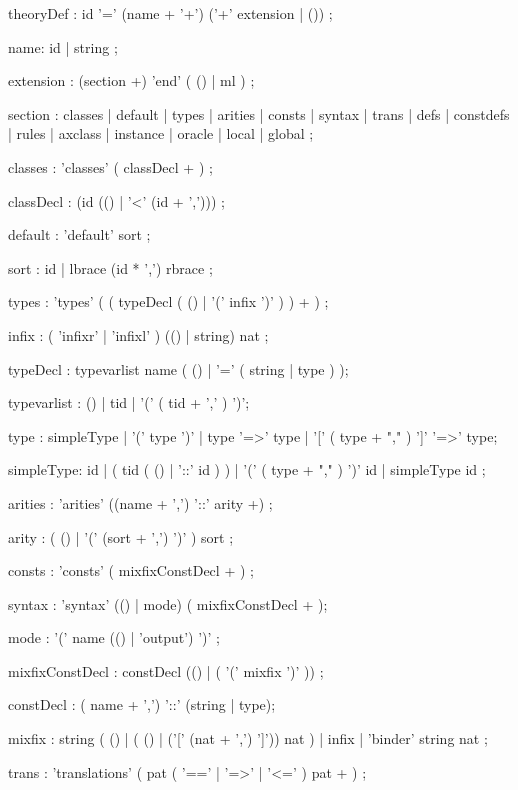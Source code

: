 \begin{rail}

theoryDef : id '=' (name + '+') ('+' extension | ())
          ;

name: id | string
    ;

extension : (section +) 'end' ( () | ml )
          ;

section : classes
        | default
        | types
        | arities
        | consts
        | syntax
        | trans
        | defs
        | constdefs
        | rules
        | axclass
        | instance
        | oracle
        | local
        | global
        ;

classes : 'classes' ( classDecl + )
        ;

classDecl : (id (() | '<' (id + ',')))
        ;

default : 'default' sort 
        ;

sort :  id
     | lbrace (id * ',') rbrace
     ;

types : 'types' ( ( typeDecl ( () | '(' infix ')' ) ) + )
      ;

infix : ( 'infixr' | 'infixl' ) (() | string) nat
      ;

typeDecl : typevarlist name
           ( () | '=' ( string | type ) );

typevarlist : () | tid | '(' ( tid + ',' ) ')';

type : simpleType | '(' type ')' | type '=>' type |
       '[' ( type + "," ) ']' '=>' type;

simpleType: id | ( tid ( () | '::' id ) ) |
            '(' ( type + "," ) ')' id | simpleType id
          ;

arities : 'arities' ((name + ',') '::' arity +)
        ;

arity : ( () | '(' (sort + ',') ')' ) sort
      ;

consts : 'consts' ( mixfixConstDecl + )
       ;

syntax : 'syntax' (() | mode) ( mixfixConstDecl + );

mode : '(' name (() | 'output') ')'
     ;

mixfixConstDecl : constDecl (() | ( '(' mixfix ')' ))
                ;

constDecl : ( name + ',') '::' (string | type);

mixfix :  string ( () | ( () | ('[' (nat + ',') ']')) nat )
       |  infix
       | 'binder' string nat ;

trans : 'translations' ( pat ( '==' | '=>' | '<=' ) pat + )
      ;


\end{rail}
